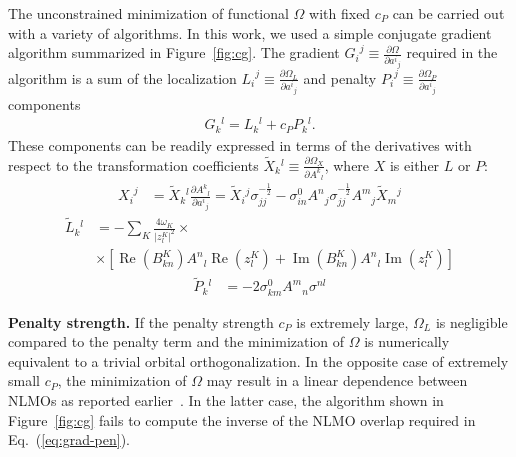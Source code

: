 \documentclass[aps,prl,reprint,amsmath,amssymb]{revtex4-1}
\begin{document}
The unconstrained minimization of functional $\Omega$ with fixed $c_P$ can be carried out with a variety of algorithms. In this work, we used a simple conjugate gradient algorithm summarized in Figure~\ref{fig:cg}. The gradient ${G_i}^j \equiv \frac{\partial \Omega}{\partial {a^i}_j}$  required in the algorithm is a sum of the localization ${L_i}^j \equiv \frac{\partial \Omega_L}{\partial {a^i}_j}$ and penalty ${P_i}^j \equiv \frac{\partial \Omega_P}{\partial {a^i}_j}$ components
%
\begin{equation} \label{eq:grad}
\begin{split}
G{_k}^{l} = L{_k}^{l} + c_P P{_k}^{l}.
\end{split}
\end{equation}
%
These components can be readily expressed in terms of the derivatives with respect to the transformation coefficients $\tilde{X}{_k}^l \equiv \frac{\partial \Omega_X}{\partial {A^k}_l}$, where $X$ is either $L$ or $P$:
%
\begin{equation} \label{eq:grad-convert}
\begin{split}
{X_i}^j & = \tilde{X}{_k}^l \frac{\partial {A^k}_l}{\partial {a^i}_j} = \tilde{X}{_i}^j \sigma_{jj}^{-\frac{1}{2}} - \sigma_{in}^0 {A^n}_j  \sigma_{jj}^{-\frac{1}{2}} {A^m}_j \tilde{X}{_m}^j
\end{split}
\end{equation}
%
\begin{equation} \label{eq:grad-loc}
\begin{split}
\tilde{L}{_k}^l & = - \sum_K \frac{4 \omega_K}{\vert z_{l}^{K} \vert^2} \times \\ 
&\times \left[  \operatorname{Re}(B^{K}_{kn}) {A^{n}}_{l} \operatorname{Re}(z_{l}^{K}) + \operatorname{Im}(B^{K}_{kn}) {A^{n}}_{l} \operatorname{Im}(z_{l}^{K}) \right]
\end{split}
\end{equation}
%
\begin{equation} \label{eq:grad-pen}
\begin{split}
\tilde{P}{_k}^l & = -2 \sigma_{km}^0 {A^m}_n \sigma^{nl} 
\end{split}
\end{equation}
%

\textbf{Penalty strength.} If the penalty strength $c_P$ is extremely large, $\Omega_L$ is negligible compared to the penalty term and the minimization of $\Omega$ is numerically equivalent to a trivial orbital orthogonalization. In the opposite case of extremely small $c_P$, the minimization of $\Omega$ may result in a linear dependence between NLMOs as reported earlier~\cite{RZK}. %
In the latter case, the algorithm shown in Figure~\ref{fig:cg} fails to compute the inverse of the NLMO overlap required in Eq.~(\ref{eq:grad-pen}). 
\end{document}
